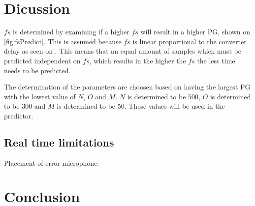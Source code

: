 \section{Dicussion}

$fs$ is determined by examining if a higher $fs$ will result in a higher PG, shown on \autoref{fig:fsPredict}. This is assumed because $fs$ is linear proportional to the converter delay as seen on . This means that an equal amount of samples which must be predicted independent on $fs$, which results in the higher the $fs$ the less time needs to be predicted. 

The determination of the parameters are choosen based on having the largest PG with the lowest value of $N$, $O$ and $M$. $N$ is determined to be 500, $O$ is determined to be 300 and $M$ is determined to be 50. These values will be used in the predictor.




\subsection*{Real time limitations}
Placement of error microphone.


\section{Conclusion}
